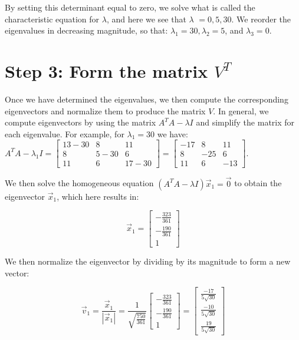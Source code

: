 \documentclass[10pt]{article}
\begin{document}
By setting this determinant equal to zero, we solve what is called the characteristic equation for $\lambda$, and here we see that $\lambda$ $=0,5,30$. We reorder the eigenvalues in decreasing magnitude, so that: $\lambda_{1}=30, \lambda_{2}=5$, and $\lambda_{3}=0$.

\section*{Step 3: Form the matrix $V^{T}$}
Once we have determined the eigenvalues, we then compute the corresponding eigenvectors and normalize them to produce the matrix $V$. In general, we compute eigenvectors by using the matrix $A^{T} A-\lambda I$ and simplify the matrix for each eigenvalue. For example, for $\lambda_{1}=30$ we have:\\
$A^{T} A-\lambda_{1} I=\left[\begin{array}{ccc}13-30 & 8 & 11 \\ 8 & 5-30 & 6 \\ 11 & 6 & 17-30\end{array}\right]=\left[\begin{array}{ccc}-17 & 8 & 11 \\ 8 & -25 & 6 \\ 11 & 6 & -13\end{array}\right]$.

We then solve the homogeneous equation $\left(A^{T} A-\lambda I\right) \vec{x}_{1}=\overrightarrow{0}$ to obtain the eigenvector $\vec{x}_{1}$, which here results in:

$$
\vec{x}_{1}=\left[\begin{array}{c}
-\frac{323}{361} \\
-\frac{190}{361} \\
1
\end{array}\right]
$$

We then normalize the eigenvector by dividing by its magnitude to form a new vector:

$$
\vec{v}_{1}=\frac{\vec{x}_{1}}{\left|\vec{x}_{1}\right|}=\frac{1}{\sqrt{\frac{750}{361}}}\left[\begin{array}{c}
-\frac{323}{361} \\
-\frac{190}{361} \\
1
\end{array}\right]=\left[\begin{array}{c}
\frac{-17}{5 \sqrt{30}} \\
\frac{-10}{5 \sqrt{30}} \\
\frac{19}{5 \sqrt{30}}
\end{array}\right]
$$
\end{document}
